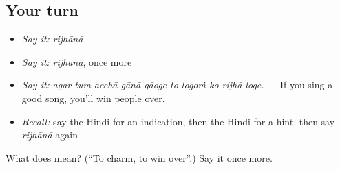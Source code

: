 \subsection*{Your turn}
\begin{itemize}
\raggedright
  \item \emph{Say it:} \emph{rijhānā}
  \item \emph{Say it:} \emph{rijhānā}, once more
  \item \emph{Say it:} \emph{agar tum acchā gānā gāoge to logoṁ ko rijhā loge.} — If you sing a good song, you'll win people over.
  \item \emph{Recall:} say the Hindi for an indication, then the Hindi for a hint, then say \emph{rijhānā} again
\end{itemize}

\begin{tcolorbox}[breakable,colback=teal!4,colframe=teal!35!black,title={Before you move on}]
What does  mean? (\textquotedblleft{}To charm, to win over\textquotedblright{}.) Say it once more.
\end{tcolorbox}
